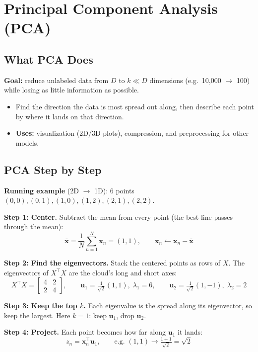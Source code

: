 \section*{Principal Component Analysis (PCA)}

\subsection*{What PCA Does}
\textbf{Goal:} reduce unlabeled data from $D$ to $k \ll D$ dimensions (e.g.\ 10{,}000 $\rightarrow$ 100) while losing as little information as possible.
\begin{itemize}
  \item Find the direction the data is most spread out along, then describe each point by where it lands on that direction.
  \item \textbf{Uses:} visualization (2D/3D plots), compression, and preprocessing for other models.
\end{itemize}

\subsection*{PCA Step by Step}
\textbf{Running example} (2D $\rightarrow$ 1D): 6 points $(0,0),(0,1),(1,0),(1,2),(2,1),(2,2)$.

\textbf{Step 1: Center.} Subtract the mean from every point (the best line passes through the mean):
\[
\bar{\mathbf{x}} = \frac1N\sum_{n=1}^N \mathbf{x}_n = (1,1),
\qquad
\mathbf{x}_n \leftarrow \mathbf{x}_n - \bar{\mathbf{x}}
\]

\textbf{Step 2: Find the eigenvectors.} Stack the centered points as rows of $X$. The eigenvectors of $X^\top X$ are the cloud's long and short axes:
\[
X^\top X = \begin{bmatrix}4&2\\2&4\end{bmatrix},
\qquad
\mathbf{u}_1 = \tfrac{1}{\sqrt2}(1,1),\; \lambda_1 = 6,
\qquad
\mathbf{u}_2 = \tfrac{1}{\sqrt2}(1,-1),\; \lambda_2 = 2
\]

\textbf{Step 3: Keep the top $k$.} Each eigenvalue is the spread along its eigenvector, so keep the largest. Here $k = 1$: keep $\mathbf{u}_1$, drop $\mathbf{u}_2$.

\textbf{Step 4: Project.} Each point becomes how far along $\mathbf{u}_1$ it lands:
\[
z_n = \mathbf{x}_n^\top \mathbf{u}_1,
\qquad \text{e.g.\ } (1,1) \rightarrow \tfrac{1+1}{\sqrt2} = \sqrt2
\]

